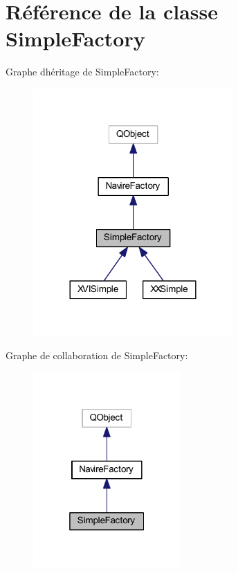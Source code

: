 \hypertarget{class_simple_factory}{}\section{Référence de la classe Simple\+Factory}
\label{class_simple_factory}


Graphe d\textquotesingle{}héritage de Simple\+Factory\+:
\nopagebreak
\begin{figure}[H]
\begin{center}
\leavevmode
\includegraphics[width=216pt]{class_simple_factory__inherit__graph}
\end{center}
\end{figure}


Graphe de collaboration de Simple\+Factory\+:
\nopagebreak
\begin{figure}[H]
\begin{center}
\leavevmode
\includegraphics[width=160pt]{class_simple_factory__coll__graph}
\end{center}
\end{figure}
